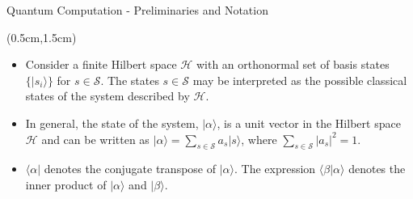 \documentclass{beamer}
\theoremstyle{definition}
\begin{document}




\begin{frame}{Quantum Computation - Preliminaries and Notation}
    
    \begin{textblock*}{12cm}(0.5cm,1.5cm)
        \begin{itemize}
            \item Consider a finite Hilbert space $\mathcal{H}$ with an orthonormal set of basis states $\{ \lvert s_i \rangle \}$ for $s \in \mathcal{S}$. The states $s \in \mathcal{S}$ may be interpreted as the possible classical states of the system described by $\mathcal{H}$. \\
            \vspace{1cm}
            \item In general, the state of the system, $\lvert \alpha \rangle$, is a unit vector in the Hilbert space $\mathcal{H}$ and can be written as $\lvert \alpha \rangle = \sum_{s \in \mathcal{S}} a_s \lvert s \rangle$, where $\sum_{s \in \mathcal{S}} |a_s|^2 = 1$. \\
            \vspace{1cm}
            \item $\langle \alpha \rvert$ denotes the conjugate transpose of $\lvert \alpha \rangle$. The expression $\langle \beta \rvert \alpha \rangle$ denotes the inner product of $\lvert \alpha \rangle$ and $\lvert \beta \rangle$.

        \end{itemize}
            
    \end{textblock*}
\end{frame}
\end{document}
